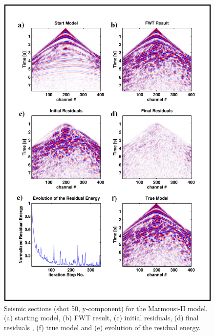 \begin{figure}
\centering
\includegraphics[width=12.5 cm]{figures/marmousi/marmousi_seis_results_WIT.pdf}
\caption{Seismic sections (shot 50, y-component) for the Marmousi-II model. (a) starting model, (b) FWT result, (c) initial residuals, (d) final residuals , (f) true model and (e) evolution of the residual energy.}
\label{marmousi_seis}
\end{figure}
\clearpage
